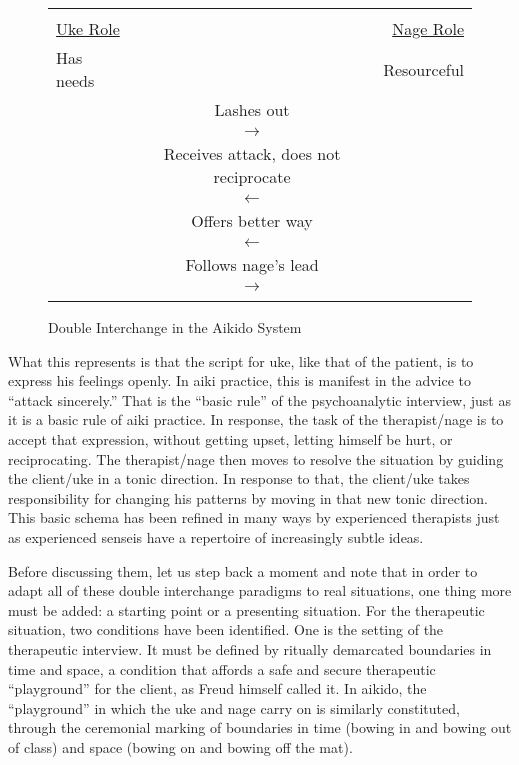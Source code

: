 \begin{figure}
\caption{Double Interchange in the Aikido System}
\small
\centering
\begin{tabular}{l c r}
\hline
 & & \\
\underline{Uke Role} & & \underline{Nage Role} \\
Has needs & & Resourceful \\
 & Lashes out & \\
 & $\longrightarrow$ & \\
 & Receives attack, does not reciprocate & \\
 & $\longleftarrow$ & \\
 & Offers better way & \\
 & $\longleftarrow$ & \\
 & Follows nage's lead & \\
 & $\longrightarrow$ & \\
 & & \\
\hline
\end{tabular}
\end{figure}

What this represents is that the script for uke, like that of the patient, is to express his feelings openly. In aiki practice, this is manifest in the advice to ``attack sincerely.'' That is the ``basic rule'' of the psychoanalytic interview, just as it is a basic rule of aiki practice. In response, the task of the therapist/nage is to accept that expression, without getting upset, letting himself be hurt, or reciprocating. The therapist/nage then moves to resolve the situation by guiding the client/uke in a tonic direction. In response to that, the client/uke takes responsibility for changing his patterns by moving in that new tonic direction. This basic schema has been refined in many ways by experienced therapists just as experienced senseis have a repertoire of increasingly subtle ideas. 

Before discussing them, let us step back a moment and note that in order to adapt all of these double interchange paradigms to real situations, one thing more must be added: a starting point or a presenting situation. For the therapeutic situation, two conditions have been identified. One is the setting of the therapeutic interview. It must be defined by ritually demarcated boundaries in time and space, a condition that affords a safe and secure therapeutic ``playground'' for the client, as Freud himself called it. In aikido, the ``playground'' in which the uke and nage carry on is similarly constituted, through the ceremonial marking of boundaries in time (bowing in and bowing out of class) and space (bowing on and bowing off the mat).

